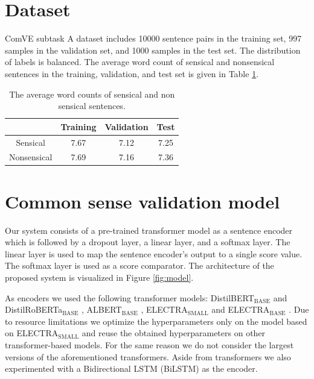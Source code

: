 \documentclass[10pt, a4paper]{article}
\begin{document}
\section{Dataset}
\label{data}
ComVE subtask A dataset includes 10000 sentence pairs in the training set, 997 samples in the validation set, and 1000 samples in the test set. The distribution of labels is balanced. The average word count of sensical and nonsensical sentences in the training, validation, and test set is given in Table \ref{lengths}.
\begin{table}[]
    \caption{The average word counts of sensical and non sensical sentences.}

    \begin{center}
    \begin{tabular}{cccc}
        \toprule
        & Training & Validation & Test\\
        \midrule
        Sensical & 7.67 & 7.12 & 7.25\\
        Nonsensical & 7.69 & 7.16 & 7.36 \\
        \bottomrule
    \end{tabular}
    
    \end{center}

    \label{lengths}
\end{table}

\section{Common sense validation model} %
\label{model} %
Our system consists of a pre-trained transformer model as a sentence encoder which is followed by a dropout layer, a linear layer, and a softmax layer. The linear layer is used to map the sentence encoder's output to a single score value. The softmax layer is used as a score comparator. The architecture of the proposed system is visualized in Figure \ref{fig:model}.

As encoders we used the following transformer models: DistilBERT$_{\text{BASE}}$ and DistilRoBERTa$_{\text{BASE}}$ \citep{distil-bert}, ALBERT$_{\text{BASE}}$ \citep{albert}, ELECTRA$_{\text{SMALL}}$ and ELECTRA$_{\text{BASE}}$ \citep{electra}. Due to resource limitations we optimize the hyperparameters only on the model based on ELECTRA$_{\text{SMALL}}$ and reuse the obtained hyperparameters on other transformer-based models. For the same reason we do not consider the largest versions of the aforementioned transformers. Aside from transformers we also experimented with a Bidirectional LSTM (BiLSTM) \citep{schuster1997bilstm} as the encoder.
\end{document}
